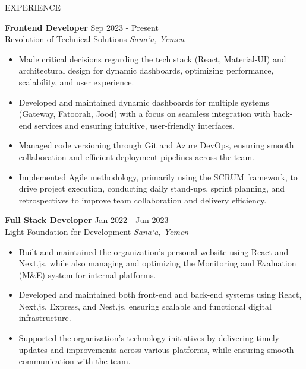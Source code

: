 \documentclass{resume} %
\begin{document}
\begin{rSection}{EXPERIENCE}

\textbf{Frontend Developer} \hfill Sep 2023 - Present\\
Revolution of Technical Solutions \hfill \textit{Sana'a, Yemen}
 \begin{itemize}
    \itemsep -3pt {} 
    \item Made critical decisions regarding the tech stack (React, Material-UI) and architectural design for dynamic dashboards, optimizing performance, scalability, and user experience.
    \item Developed and maintained dynamic dashboards for multiple systems (Gateway, Fatoorah, Jood) with a focus on seamless integration with back-end services and ensuring intuitive, user-friendly interfaces.
    \item Managed code versioning through Git and Azure DevOps, ensuring smooth collaboration and efficient deployment pipelines across the team.
    \item Implemented Agile methodology, primarily using the SCRUM framework, to drive project execution, conducting daily stand-ups, sprint planning, and retrospectives to improve team collaboration and delivery efficiency.
 \end{itemize}

 \textbf{Full Stack Developer} \hfill Jan 2022 - Jun 2023\\
Light Foundation for Development \hfill \textit{Sana‘a, Yemen}
 \begin{itemize}
    \itemsep -3pt {}
    \item Built and maintained the organization's personal website using React and Next.js, while also managing and optimizing the Monitoring and Evaluation (M\&E) system for internal platforms.
    \item Developed and maintained both front-end and back-end systems using React, Next.js, Express, and Nest.js, ensuring scalable and functional digital infrastructure.
    \item Supported the organization’s technology initiatives by delivering timely updates and improvements across various platforms, while ensuring smooth communication with the team.
 \end{itemize}
 

\end{rSection}
\end{document}

